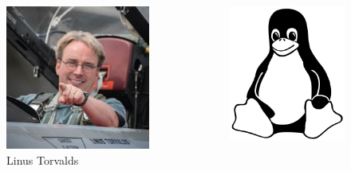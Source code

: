 \documentclass[12pt]{beamer}
\begin{document}
\begin{frame}
	\begin{columns}
		\begin{column}{0.5\linewidth}
			\begin{figure}
				\centering
				\includegraphics[width=\linewidth]{Linus-Torvalds}
				\caption{Linus Torvalds}
			\end{figure}
		\end{column}
		\begin{column}{0.5\linewidth}
			\begin{figure}
				\centering
				\includegraphics[width=0.9\linewidth]{linux_PNG5}

\end{figure}
\end{column}
\end{columns}
\end{frame}
\end{document}
